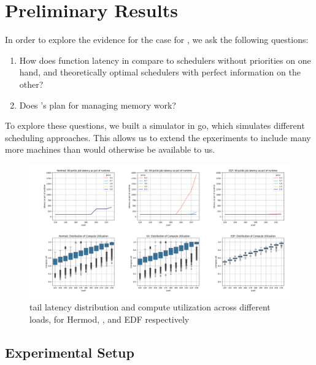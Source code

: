 \section{Preliminary Results}



In order to explore the evidence for the case for \sys{}, we ask the following
questions: 
\begin{enumerate}
    \item How does function latency in \sys{} compare to schedulers without
    priorities on one hand, and theoretically optimal schedulers with perfect
    information on the other?
    \item Does \sys{}'s plan for managing memory work?
\end{enumerate}


To explore these questions, we built a simulator in go\cite{golang}, which
simulates different scheduling approaches. This allows us to extend the
epxeriments to include many more machines than would otherwise be available to
us.

\begin{figure}[t!]
    \centering
      \includegraphics[width=16cm]{img/hermod_xx_edf_latencies.png}
      \caption{ tail latency distribution and compute utilization across
      different loads, for Hermod, \sys{}, and EDF respectively }
    \label{fig:hermod-xx-edf}
\end{figure}


\subsection{Experimental Setup}

